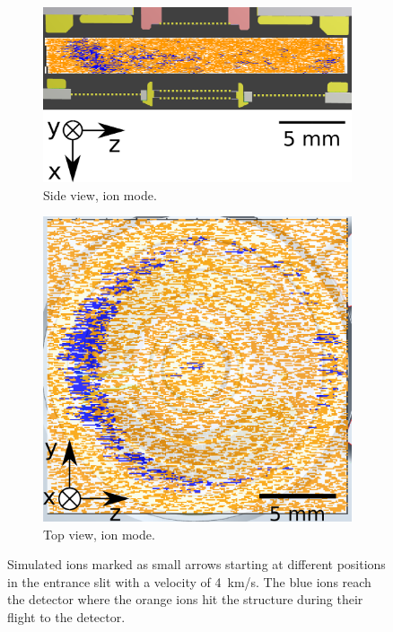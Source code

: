 	\begin{figure}[h] %
		\begin{subfigure}[t]{.5\textwidth}
			\centering
			\includegraphics[width=.8\textwidth]{Experiments/PFMEntrance_Side_iSim.png}
			\caption{Side view, ion mode.}
		\end{subfigure}
		\begin{subfigure}[t]{.5\textwidth}
			\centering
			\includegraphics[width=.8\textwidth]{Experiments/PFMEntrance_Top_iSim.png}
			\caption{Top view, ion mode.}
		\end{subfigure}
		\caption{Simulated ions marked as small arrows starting at different positions in the entrance slit with a velocity of 4~km/s. The blue ions reach the detector where the orange ions hit the structure during their flight to the detector.}
		\label{fig:PFMentrSideTopSimiMode}
	\end{figure}
